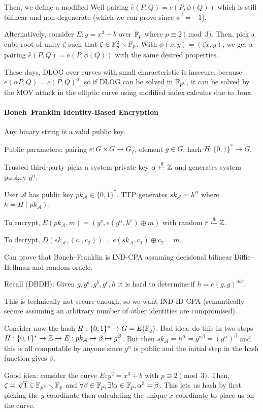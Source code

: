 \documentclass[notes]{agony}
\newcommand{\xgets}{\xleftarrow}
\begin{document}
Then, we define a modified Weil pairing $\hat e(P,Q) = e(P,\phi(Q))$
which is still bilinear and non-degenerate (which we can prove since $\phi^2 = -1$).

Alternatively, consider $E : y = x^3 + b$ over $\mathbb{F}_p$ where $p \equiv 2 \pmod 3$.
Then, pick a cube root of unity $\zeta$ such that $\zeta \in \mathbb{F}_p^2 \smallsetminus \mathbb{F}_p$.
With $\phi(x,y) = (\zeta x,y)$, we get a pairing $\hat e(P,Q) = e(P,\phi(Q))$
with the same desired properties.

These days, DLOG over curves with small characteristic is insecure,
because $e(\alpha P,Q) = e(P,Q)^\alpha$, so if DLOG can be solved in $\mathbb{F}_{p^k}$,
it can be solved by the MOV attack in the elliptic curve using modified index calculus due to Joux.

\paragraph{Boneh--Franklin Identity-Based Encryption}
Any binary string is a valid public key.

Public parameters: pairing $e : G \times G \to G_T$, element $g \in G$, 
hash $H : \{0,1\}^* \to G$.

Trusted third-party picks a system private key $\alpha \xgets{\$}\Z$
and generates system pubkey $g^\alpha$.

User $\mathcal A$ has public key $pk_{\mathcal A} \in \{0,1\}^*$.
TTP generates $sk_{\mathcal A} = h^\alpha$ where $h = H(pk_{\mathcal A})$.

To encrypt, $E(pk_{\mathcal A}, m) = (g^r, e(g^\alpha, h^r) \oplus m)$ with random $r \xgets{\$} \Z$.

To decrypt, $D(sk_{\mathcal A}, (c_1, c_2)) = e(sk_{\mathcal A}, c_1) \oplus c_2 = m$.

Can prove that Boneh--Franklin is IND-CPA
assuming decisional bilinear Diffie--Hellman and random oracle.

Recall (DBDH): Given $g,g^a,g^b,g^c,h$ it is hard to determine if $h = e(g,g)^{abc}$.

This is technically not secure enough, so we want IND-ID-CPA
(semantically secure assuming an arbitrary number of other identities are compromised).

Consider now the hash $H : \{0,1\}^* \to G = E(\mathbb{F}_q)$.
Bad idea: do this in two steps $H: \{0,1\}^* \to \mathbb{Z} \to E: pk_{\mathcal A} \mapsto \beta \mapsto g^\beta$.
But then $sk_{\mathcal A} = h^\alpha = g^{\alpha\beta} = (g^\alpha)^\beta$
and this is all computable by anyone since $g^\alpha$ is public
and the initial step in the hash function gives $\beta$.

Good idea: consider the curve $E : y^2 = x^3 + b$ with $p \equiv 2 \pmod 3$.
Then, $\zeta = \sqrt[3]{1} \in \mathbb{F}_{p^2} \smallsetminus \mathbb{F}_p$
and $\forall \beta \in \mathbb{F}_p, \exists! \alpha \in \mathbb{F}_p, \alpha^3 = \beta$.
This lets us hash by first picking the $y$-coordinate
then calculating the unique $x$-coordinate to place us on the curve.
\end{document}
